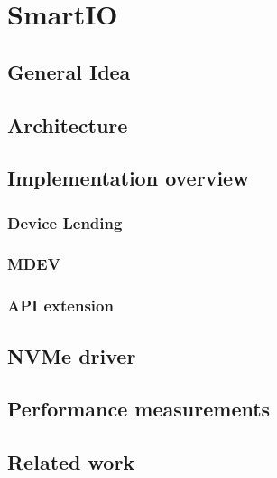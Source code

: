 \chapter{SmartIO}\label{sec:smartio}

\section{General Idea }
\section{Architecture}

\section{Implementation overview}
\subsection{Device Lending}
\subsection{MDEV}
\subsection{API extension}

\section{NVMe driver}

\section{Performance measurements}

\section{Related work}
